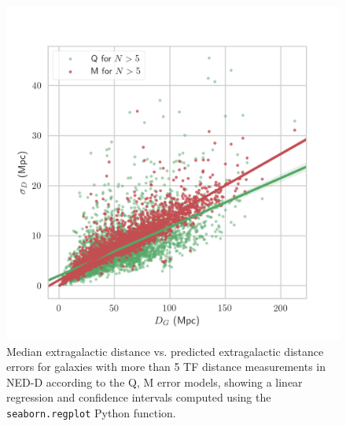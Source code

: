\documentclass[a4paper,fleqn,usenatbib]{mnras}
\begin{document}
\begin{figure}

	\includegraphics[scale=0.7]{qm.png}
    \caption{Median extragalactic distance vs. predicted extragalactic distance errors for galaxies with more than 5 TF distance measurements in NED-D according to the Q, M error models, showing a linear regression and confidence intervals computed using the \texttt{seaborn.regplot} Python function.}
    \label{fig:qm}
\end{figure}
\end{document}
